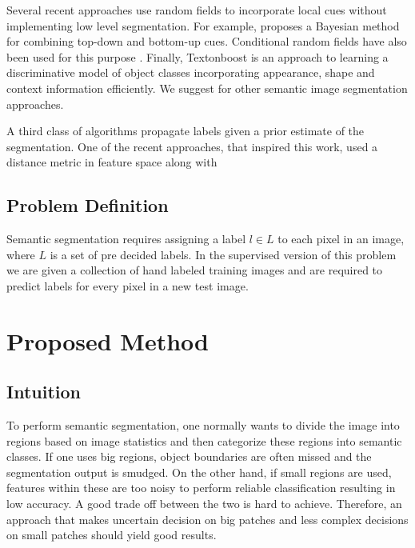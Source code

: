 \documentclass{article} %
\begin{document}
Several recent approaches use random fields to incorporate local cues without implementing low level segmentation. For example, \cite{Kumar:2005:OC:1068507.1068889} proposes a Bayesian method for combining top-down and bottom-up cues. Conditional random fields have also been used for this purpose \cite{Kumar:2005:HFF:1097115.1097790} \cite{Richard04multiscaleconditional}. Finally, Textonboost \cite{Shotton06textonboost:joint} is an approach to learning a discriminative model of object classes incorporating appearance, shape and context information efficiently. We suggest \cite{SegmentRegionsParts} for other semantic image segmentation approaches.

A third class of algorithms propagate labels given a prior estimate of the segmentation. One of the recent approaches, that inspired this work, used a distance metric in feature space along with %


\subsection{Problem Definition}
\label{sec:Problem}
Semantic segmentation requires assigning a label $l \in L$ to each pixel in an image, where $L$ is a set of pre decided labels. In the supervised version of this problem we are given a collection of hand labeled training images and are required to predict labels for every pixel in a new test image. 

\section{Proposed Method}
\label{sec:Proposed}
\subsection{Intuition}
\label{sec:intuition}
To perform semantic segmentation, one normally wants to divide the image into regions based on image statistics and then categorize these regions into semantic classes. If one uses big regions, object boundaries are often missed and the segmentation output is smudged. On the other hand, if small regions are used, features within these are too noisy to perform reliable classification resulting in low accuracy. A good trade off between the two is hard to achieve. Therefore, an approach that makes uncertain decision on big patches and less complex decisions on small patches should yield good results. 
\end{document}
